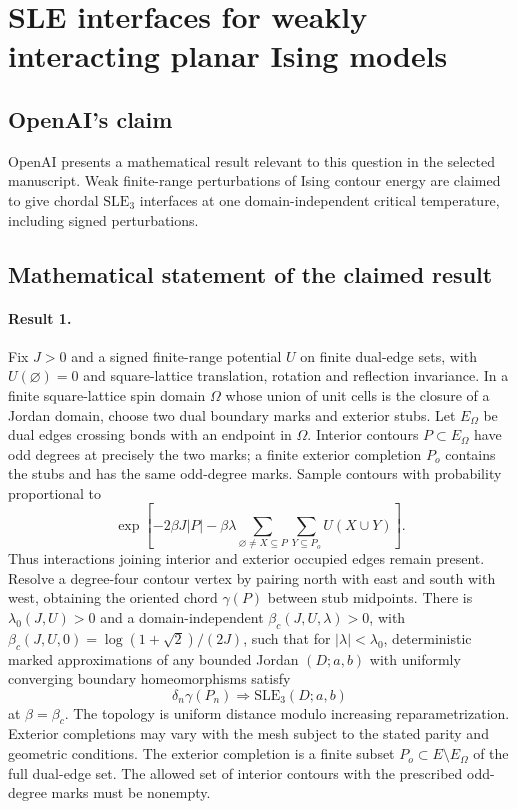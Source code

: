 \documentclass[11pt]{article}
\begin{document}
\section*{SLE interfaces for weakly interacting planar Ising models}

\subsection{OpenAI's claim}
OpenAI presents a mathematical result relevant to this question in the selected manuscript. Weak finite-range perturbations of Ising contour energy are claimed to give chordal $\mathrm{SLE}_3$ interfaces at one domain-independent critical temperature, including signed perturbations.

\subsection{Mathematical statement of the claimed result}
\paragraph{Result 1.} Fix $J>0$ and a signed finite-range potential $U$ on finite dual-edge sets, with $U(\varnothing)=0$ and square-lattice translation, rotation and reflection invariance. In a finite square-lattice spin domain $\Omega$ whose union of unit cells is the closure of a Jordan domain, choose two dual boundary marks and exterior stubs. Let $E_\Omega$ be dual edges crossing bonds with an endpoint in $\Omega$. Interior contours $P\subset E_\Omega$ have odd degrees at precisely the two marks; a finite exterior completion $P_o$ contains the stubs and has the same odd-degree marks. Sample contours with probability proportional to
\[
 \exp\left[-2\beta J|P|-\beta\lambda
 \sum_{\varnothing\ne X\subseteq P}\sum_{Y\subseteq P_o}U(X\cup Y)\right].
\]
Thus interactions joining interior and exterior occupied edges remain present. Resolve a degree-four contour vertex by pairing north with east and south with west, obtaining the oriented chord $\gamma(P)$ between stub midpoints. There is $\lambda_0(J,U)>0$ and a domain-independent $\beta_c(J,U,\lambda)>0$, with $\beta_c(J,U,0)=\log(1+\sqrt2)/(2J)$, such that for $|\lambda|<\lambda_0$, deterministic marked approximations of any bounded Jordan $(D;a,b)$ with uniformly converging boundary homeomorphisms satisfy
\[
 \delta_n\gamma(P_n)\Longrightarrow\mathrm{SLE}_3(D;a,b)
\]
at $\beta=\beta_c$. The topology is uniform distance modulo increasing reparametrization. Exterior completions may vary with the mesh subject to the stated parity and geometric conditions. The exterior completion is a finite subset $P_o\subset E\setminus E_\Omega$ of the full dual-edge set. The allowed set of interior contours with the prescribed odd-degree marks must be nonempty.
\end{document}

